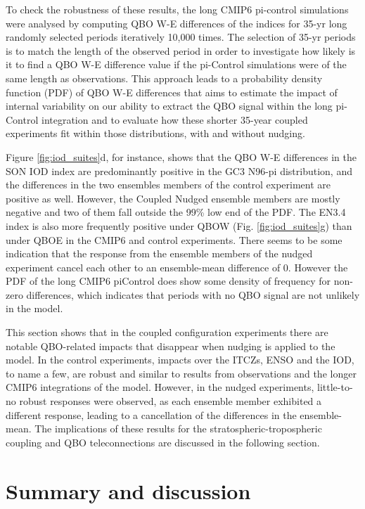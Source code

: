 To check the robustness of these results, the long CMIP6 pi-control simulations were analysed by computing QBO W-E differences of the indices for 35-yr long randomly selected periods iteratively 10,000 times. The selection of 35-yr periods is to match the length of the observed period in order to investigate how likely is it to find a QBO W-E difference value if the pi-Control simulations were of the same length as observations. This approach leads to a probability density function (PDF) of QBO W-E differences that aims to estimate the impact of internal variability on our ability to extract the QBO signal within the long pi-Control integration and to evaluate how these shorter 35-year coupled experiments fit within those distributions, with and without nudging. 


Figure \ref{fig:iod_suites}d, for instance, shows that the QBO W-E differences in the SON IOD index are predominantly positive in the GC3 N96-pi distribution, and the differences in the two ensembles members of the control experiment are positive as well. However, the Coupled Nudged ensemble members are mostly negative and two of them fall outside the 99\% low end of the PDF.
The EN3.4 index is also more frequently positive under QBOW (Fig. \ref{fig:iod_suites}g) than under QBOE in the CMIP6 and control experiments. There seems to be some indication that the response from the ensemble members of the nudged experiment cancel each other to an ensemble-mean difference of 0. However the PDF of the long CMIP6 piControl does show some density of frequency for non-zero differences, which indicates that periods with no QBO signal are not unlikely in the model. %

This section shows that in the coupled configuration experiments there are notable
QBO-related impacts that disappear when nudging is applied to the model. In the control 
experiments, impacts over the ITCZs, ENSO and the IOD, to name a few, are robust and similar to results from observations and the longer CMIP6 integrations of the model. However, in the nudged experiments, little-to-no robust responses were observed, as each ensemble member exhibited a different response, leading to a cancellation of the differences in the ensemble-mean. The implications of these results for the stratospheric-tropospheric coupling and QBO teleconnections are discussed in the following section.  

\section{Summary and discussion}

